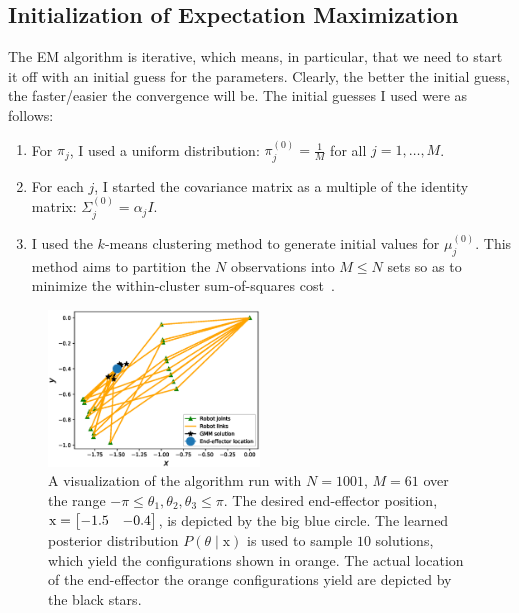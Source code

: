 \subsection{Initialization of Expectation Maximization}
\label{ssec:initialization}
%
The EM algorithm is iterative, which means, in particular, that we need to start
it off with an initial guess for the parameters. Clearly, the better the initial
guess, the faster/easier the convergence will be. The initial guesses I used
were as follows:
%
\begin{enumerate}
    \setlength\itemsep{0.0em}
    \item For $\pi_j$, I used a uniform distribution: $\pi_j^{(0)} =
    \frac{1}{M}$ for all $j = 1, \ldots, M$.
    \item For each $j$, I started the covariance matrix as a multiple of the
    identity matrix: $\Sigma_j^{(0)} = \alpha_j I$.
    \item I used the $k$-means clustering method to generate initial values for
    $\mu_j^{(0)}$. This method aims to partition the $N$ observations into $M
    \leq N$ sets so as to minimize the within-cluster sum-of-squares
    cost~\cite{wiki:K-means_clustering}.
\end{enumerate}
%
\begin{figure}
    \vspace{-20mm}
	\centering
	\includegraphics[width=0.5\textwidth]{./figures/GMM_sample_solution-v1.eps}
	\caption{A visualization of the algorithm run with $N=1001$, $M=61$ over the
    range $-\pi \leq \theta_1, \theta_2, \theta_3 \leq \pi$. The desired
    end-effector position, $\mathrm{x} = \begin{bmatrix}-1.5 & -0.4\end{bmatrix}$, is depicted by the
    big blue circle. The learned posterior distribution $P(\theta \mid
    \mathrm{x})$ is used to sample $10$ solutions, which yield the
    configurations shown in orange. The actual location of the end-effector the
    orange configurations yield are depicted by the black stars.}
    \label{fig:example_sol}
    \vspace{-30mm}
\end{figure}
%

